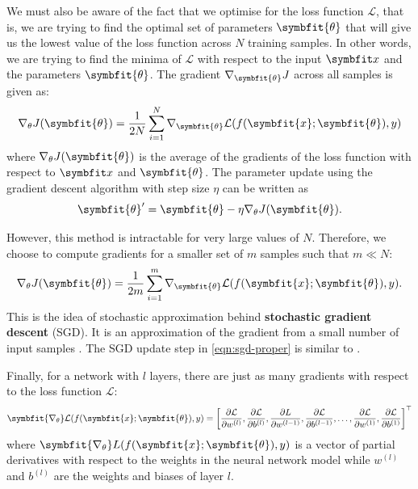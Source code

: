 We must also be aware of the fact that we optimise for the loss function $\mathcal{L}$, that is, we are trying to find the optimal set of parameters $\symbfit{\theta}$ that will give us the lowest value of the loss function across $N$ training samples. In other words, we are trying to find the minima of $\mathcal L$ with respect to the input $\symbfit x$ and the parameters $\symbfit{\theta}$.
The gradient $\nabla_{\symbfit{\theta}}J$ across all samples is given as:
\begin{equation}
    \nabla_{\theta} J(\symbfit{\theta}) = \frac{1}{2N} \sum_{i=1}^{N}\nabla_{\symbfit{\theta}}\mathcal{L}(f(\symbfit{x};\symbfit{\theta}), y)
\end{equation}
where $\nabla_{\theta} J(\symbfit{\theta})$ is the average of the gradients of the loss function with respect to $\symbfit x$ and $\symbfit{\theta}$. The parameter update using the gradient descent algorithm with step size $\eta$ can be written as
\begin{equation}
    \label{eqn:basic-gd}
    \symbfit{\theta}^\prime=\symbfit{\theta}-\eta \nabla_{\theta} J(\symbfit{\theta}).
\end{equation}

However, this method is intractable for very large values of $N$. Therefore, we choose to compute gradients for a smaller set of $m$ samples such that $m \ll N$:
\begin{equation}
\label{eqn:sgd-proper}
    \nabla_{\theta} J(\symbfit{\theta}) = \frac{1}{2m} \sum_{i=1}^{m}\nabla_{\symbfit{\theta}}\mathcal{L}(f(\symbfit{x};\symbfit{\theta}), y).
\end{equation}
This is the idea of stochastic approximation behind \textbf{stochastic gradient descent} (SGD). It is an approximation of the gradient from a small number of input samples \parencite{Bottou2016}. The SGD update step in \cref{eqn:sgd-proper} is similar to .

Finally, for a network with $l$ layers, there are just as many gradients with respect to the loss function $\mathcal{L}$:
\begin{equation}
    \symbfit{\nabla_{\theta}} \mathcal{L}(f(\symbfit{x};\symbfit{\theta}), y) = \bigg[\frac{\partial \mathcal{L}}{\partial w^{(l)}}, \frac{\partial \mathcal{L}}{\partial b^{(l)}}, \frac{\partial L}{\partial w^{(l-1)}}, \frac{\partial \mathcal{L}}{\partial b^{(l-1)}}, \ldots, \frac{\partial \mathcal{L}}{\partial w^{(1)}}, \frac{\partial \mathcal{L}}{\partial b^{(1)}}\bigg]^\top
\end{equation}
where $\symbfit{\nabla_{\theta}} L(f(\symbfit{x};\symbfit{\theta}), y)$ is a vector of partial derivatives with respect to the weights in the neural network model while $w^{(l)}$ and $b^{(l)}$ are the weights and biases of layer $l$.
